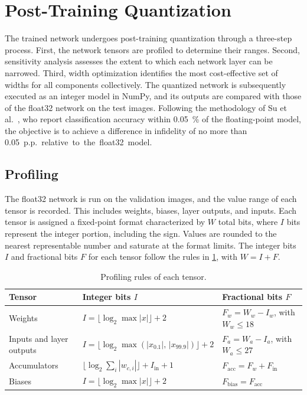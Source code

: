 \section{Post-Training Quantization}\label{sec:quant}

The trained network undergoes post-training quantization through a three-step process. First, the network tensors are profiled to determine their ranges. Second, sensitivity analysis assesses the extent to which each network layer can be narrowed. Third, width optimization identifies the most cost-effective set of widths for all components collectively. The quantized network is subsequently executed as an integer model in NumPy, and its outputs are compared with those of the float32 network on the test images. Following the methodology of Su et al.~\cite{su2026}, who report classification accuracy within \SI{0.05}{\percent} of the floating-point model, the objective is to achieve a difference in infidelity of no more than \SI{0.05}{p.p.} relative to the float32 model.

\subsection{Profiling} The float32 network is run on the validation images, and the value range of each tensor is recorded. This includes weights, biases, layer outputs, and inputs.
Each tensor is assigned a fixed-point format characterized by $W$ total bits, where $I$ bits represent the integer portion, including the sign. Values are rounded to the nearest representable number and saturate at the format limits.
The integer bits $I$ and fractional bits $F$ for each tensor follow the rules in \cref{tab:profile-rules}, with $W = I + F$.


\begin{table}[H]
  \centering
  \caption{Profiling rules of each tensor.}
  \label{tab:profile-rules}
  \begin{tabular}{@{}lll@{}}
    \toprule
    Tensor & Integer bits $I$ & Fractional bits $F$ \\
        \midrule
            Weights & $I = \lfloor\log_2 \max|x|\rfloor + 2$ & $F_w = W_w - I_w$, with $W_w \le 18$ \\
            Inputs and layer outputs & $I = \lfloor \log_2 \max(|x_{0.1}|,\,|x_{99.9}|) \rfloor + 2$ & $F_a = W_a - I_a$, with $W_a \le 27$ \\
            Accumulators & $\lfloor \log_2 \sum_i |w_{c,i}| \rfloor + I_{\mathrm{in}} + 1$ & $F_{\mathrm{acc}} = F_w + F_{\mathrm{in}}$ \\
            Biases & $I = \lfloor\log_2 \max|x|\rfloor + 2$ & $F_{\mathrm{bias}} = F_{\mathrm{acc}}$ \\
        \bottomrule
    \end{tabular}
\end{table}


